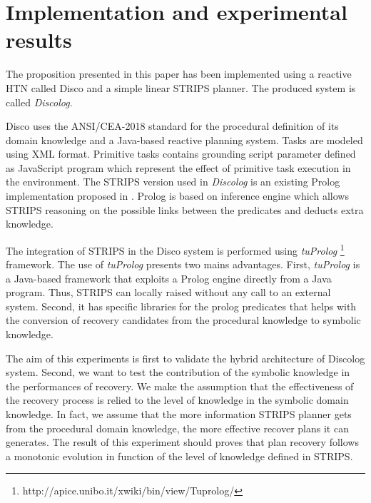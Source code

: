 \documentclass[conference]{IEEEtran}
\begin{document}
	
	
	
	
	\section{Implementation and experimental results}
	
	\par The proposition presented in this paper has been implemented using a reactive HTN called  Disco \cite{rich2009building} and a simple linear STRIPS planner. The produced system is called \emph{Discolog}. 
	\par  Disco uses the ANSI/CEA-2018 standard for the procedural definition of its domain knowledge and a Java-based reactive planning system. Tasks are modeled using XML format. Primitive tasks contains grounding script parameter defined	as JavaScript program which represent the effect of  primitive task execution in the environment. The STRIPS version used in \emph{Discolog} is an existing  Prolog implementation proposed in \cite{poole1998computational}. Prolog is based on inference engine  which allows STRIPS reasoning on the possible links between the predicates and deducts extra knowledge.
	\par  The integration of STRIPS in the Disco system is performed using  \emph{tuProlog} \footnote{http://apice.unibo.it/xwiki/bin/view/Tuprolog/} framework. The use of  \emph{tuProlog} presents two mains advantages. First, \emph{tuProlog} is a Java-based framework that exploits a Prolog engine directly from a Java program. Thus, STRIPS can locally raised without any call to an external system. Second, it has specific libraries for the prolog predicates that helps with the conversion of recovery candidates from the procedural knowledge to symbolic knowledge. 
	
	\par  The aim of this  experiments is first to validate the hybrid architecture of Discolog system. Second, we want to test the contribution of the symbolic knowledge in the performances of recovery. We make the assumption that the effectiveness of the recovery process is relied to the level of knowledge in the symbolic domain knowledge. In fact, we assume that the more information STRIPS planner gets from the procedural domain knowledge, the more effective recover plans it can generates. The result of this experiment should proves that plan recovery follows a monotonic evolution in function of the level of knowledge defined in STRIPS.
\end{document}
